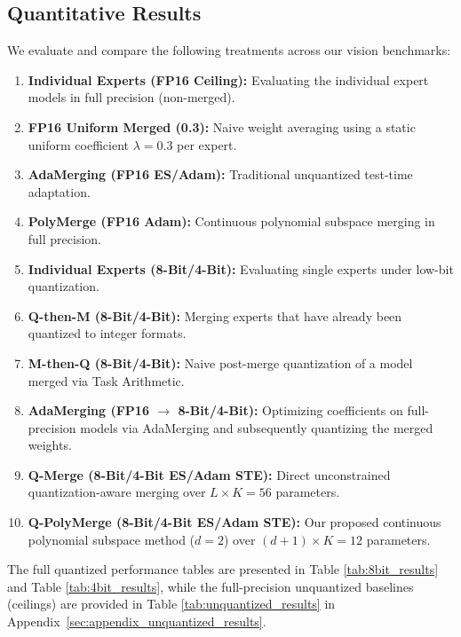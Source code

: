 \subsection{Quantitative Results}

We evaluate and compare the following treatments across our vision benchmarks:
\begin{enumerate}
    \item \textbf{Individual Experts (FP16 Ceiling):} Evaluating the individual expert models in full precision (non-merged).
    \item \textbf{FP16 Uniform Merged (0.3):} Naive weight averaging using a static uniform coefficient $\lambda = 0.3$ per expert.
    \item \textbf{AdaMerging (FP16 ES/Adam):} Traditional unquantized test-time adaptation.
    \item \textbf{PolyMerge (FP16 Adam):} Continuous polynomial subspace merging in full precision.
    \item \textbf{Individual Experts (8-Bit/4-Bit):} Evaluating single experts under low-bit quantization.
    \item \textbf{Q-then-M (8-Bit/4-Bit):} Merging experts that have already been quantized to integer formats.
    \item \textbf{M-then-Q (8-Bit/4-Bit):} Naive post-merge quantization of a model merged via Task Arithmetic.
    \item \textbf{AdaMerging (FP16 $\to$ 8-Bit/4-Bit):} Optimizing coefficients on full-precision models via AdaMerging and subsequently quantizing the merged weights.
    \item \textbf{Q-Merge (8-Bit/4-Bit ES/Adam STE):} Direct unconstrained quantization-aware merging over $L \times K = 56$ parameters.
    \item \textbf{Q-PolyMerge (8-Bit/4-Bit ES/Adam STE):} Our proposed continuous polynomial subspace method ($d=2$) over $(d+1) \times K = 12$ parameters.
\end{enumerate}

The full quantized performance tables are presented in Table \ref{tab:8bit_results} and Table \ref{tab:4bit_results}, while the full-precision unquantized baselines (ceilings) are provided in Table \ref{tab:unquantized_results} in Appendix~\ref{sec:appendix_unquantized_results}.

